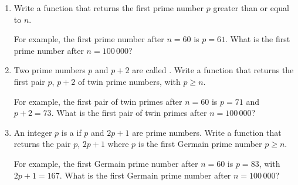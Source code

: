 \documentclass[11pt,class=report,crop=false]{standalone}
\begin{document}
\begin{activite}


\begin{enumerate}
  \item Write a  function that returns the first prime number $p$ greater than or equal to $n$. 
  
  For example, the first prime number after $n=60$ is $p=61$. 
  What is the first prime number after $n=100\,000$?
  
  \item Two prime numbers $p$ and $p+2$ are called . Write a  function that returns the first pair $p$, $p+2$ of twin prime numbers, with $p \ge n$.
  
  For example, the first pair of twin primes after $n=60$ is $p=71$ and $p+2=73$.   
  What is the first pair of twin primes after $n=100\,000$?
    
  \item An integer $p$ is a  if $p$ and $2p+1$ are prime numbers. Write a  function that returns the pair $p$, $2p+1$ where $p$ is the first Germain prime number $p \ge n$.
  
  For example, the first Germain prime number after $n=60$ is $p=83$, with $2p+1=167$.   
  What is the first Germain prime number after $n=100\,000$?
  
\end{enumerate}   
     
\end{activite}
\end{document}

